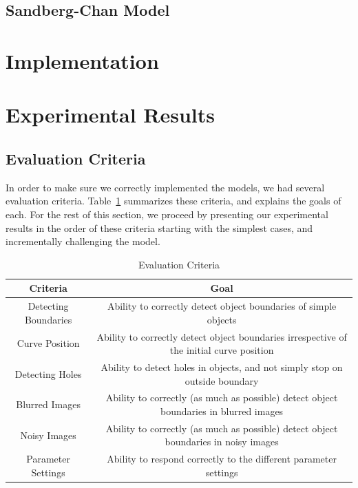 \documentclass[10pt,journal,letterpaper,compsoc]{IEEEtran}
\begin{document}
\subsection{Sandberg-Chan Model}
\label{sec:sandberg-chan}

\section{Implementation}
\label{sec:implementation}


\section{Experimental Results}
\label{sec:results}

\subsection{Evaluation Criteria}
\label{sec:criteria}

In order to make sure we correctly implemented the models, we had several evaluation criteria. Table~\ref{tab:criteria} summarizes these criteria, and explains
the goals of each. For the rest of this section, we proceed by presenting our experimental results in the order of these criteria starting with the simplest
cases, and incrementally challenging the model.

\begin{table}[h!t!]
\centering
\begin{tabular}{ c | c}
\textbf{Criteria} & \textbf{Goal} \\
\hline\hline
Detecting Boundaries & Ability to correctly detect object boundaries of simple objects\\
\hline
Curve Position & Ability to correctly detect object boundaries irrespective of the initial curve position\\
\hline
Detecting Holes & Ability to detect holes in objects, and not simply stop on outside boundary\\
\hline
Blurred Images & Ability to correctly (as much as possible) detect object boundaries in blurred images\\
\hline
Noisy Images & Ability to correctly (as much as possible) detect object boundaries in noisy images\\
\hline
Parameter Settings & Ability to respond correctly to the different parameter settings
\end{tabular}
\centering
\caption{Evaluation Criteria}
\label{tab:criteria}
\end{table}
\end{document}
